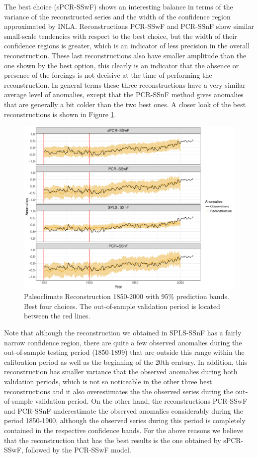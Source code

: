 \documentclass[11pt]{amsart}
\theoremstyle{plain}
\theoremstyle{definition}
\theoremstyle{remark}
\begin{document}
The best choice (sPCR-SSwF) shows an interesting
balance in terms of the variance of the reconstructed series and the width of
the confidence region approximated by INLA. Reconstructions PCR-SSwF and
PCR-SSnF show similar small-scale tendencies with respect to the best choice, but the width of their confidence regions
is greater, which is an indicator of less precision in the overall
reconstruction. These last reconstructions also have smaller amplitude than the one shown by the best
option, this clearly is an indicator that the absence or presence of the
forcings is not decisive at the time of performing the reconstruction. In
general terms these three reconstructions have a very similar average level
of anomalies, except that the PCR-SSnF method gives anomalies that are generally a
bit colder than the two best ones. A closer look of the best reconstructions is shown in Figure
\ref{fig:paleo19001}.
\begin{figure}
  \centering
  \includegraphics[scale=0.55]{Rec1900_Final}
  \caption{Paleoclimate Reconstruction 1850-2000 with 95\%
    prediction bands. Best four choices. The out-of-sample validation period is
    located between the red lines.}
  \label{fig:paleo19001}
\end{figure}
Note that although the reconstruction we obtained in
SPLS-SSnF has a fairly narrow confidence region, there are quite a few observed
anomalies during the out-of-sample testing period (1850-1899) that are outside
this range within the calibration period as well as the beginning of the 20th
century. In addition, this reconstruction has smaller variance that the observed
anomalies during both validation periods, which is not so noticeable in the other
three best reconstructions and  it also overestimates the the observed series
during the out-of-sample validation period. On the other hand, the reconstructions PCR-SSwF and PCR-SSnF  
underestimate the observed anomalies considerably during the period 1850-1900,
although the observed series during this period is completely contained in the
respective confidence bands. For the above reasons we believe that the
reconstruction that has the best results is the one obtained by sPCR-SSwF, followed
by the PCR-SSwF model. 
\end{document}
